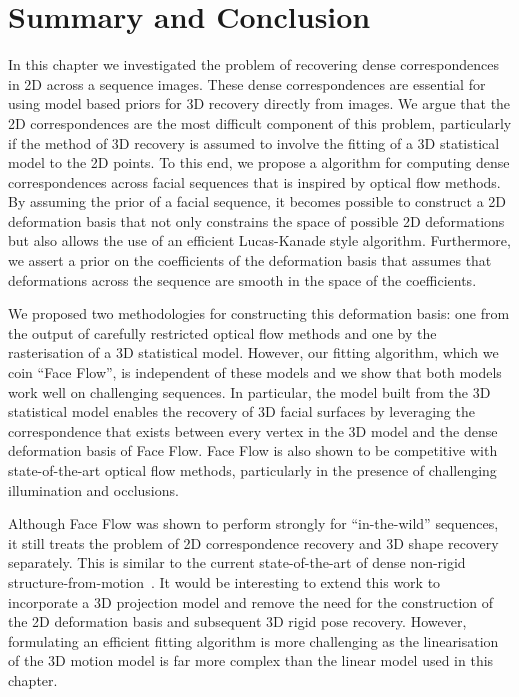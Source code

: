 \section{Summary and Conclusion}\label{sec:face_flow_conclusion}
In this chapter we investigated the problem of recovering dense correspondences
in 2D across a sequence images. These dense correspondences are essential
for using model based priors for 3D recovery directly from images. We argue that
the 2D correspondences are the most difficult component of this problem, 
particularly if the method of 3D recovery is assumed to involve the fitting
of a 3D statistical model to the 2D points. To this end, we propose a algorithm
for computing dense correspondences across facial sequences that is inspired by
optical flow methods. By assuming the prior of a facial sequence, it becomes
possible to construct a 2D deformation basis that not only constrains the space
of possible 2D deformations but also allows the use of an efficient Lucas-Kanade
style algorithm. Furthermore, we assert a prior on the coefficients
of the deformation basis that assumes that deformations across the sequence
are smooth in the space of the coefficients.

We proposed two methodologies for constructing this deformation basis: one
from the output of carefully restricted optical flow methods and one by
the rasterisation of a 3D statistical model. However, our fitting algorithm,
which we coin ``Face Flow'', is independent of these models and we show that
both models work well on challenging sequences. In particular, the model built
from the 3D statistical model enables the recovery of 3D facial surfaces by 
leveraging the correspondence that exists between every vertex in the 3D model
and the dense deformation basis of Face Flow. Face Flow is also shown to be
competitive with state-of-the-art optical flow methods, particularly in
the presence of challenging illumination and occlusions.

Although Face Flow was shown to perform strongly for ``in-the-wild'' sequences,
it still treats the problem of 2D correspondence recovery and 3D shape recovery
separately.  This is similar to the current state-of-the-art of dense non-rigid
structure-from-motion~\cite{garg2013dense}. It would be interesting to
extend this work to incorporate a 3D projection model and remove the need
for the construction of the 2D deformation basis and subsequent 3D rigid pose
recovery. However, formulating an efficient fitting algorithm is more challenging
as the linearisation of the 3D motion model is far more complex than the linear
model used in this chapter.